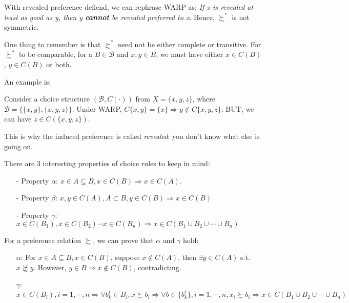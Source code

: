 With revealed preference defiend, we can rephrase WARP as: \textit{If x is revealed at least as good as y, then y \textbf{cannot} be revealed preferred to x}. Hence, $\succsim^*$ is not symmetric.

One thing to remember is that $\succsim^*$ need not be either complete or transitive. For $\succsim^*$ to be comparable, for a $B\in\mathcal{B}$ and $x,y\in B$, we must have either $x\in C(B)$, $y\in C(B)$ or both.

An example is:
\begin{example}
    Consider a choice structure $(\mathcal{B},C(\cdot))$ from $X=\{x,y,z\}$, where $\mathcal{B}=\{\{x,y\},\{x,y,z\}\}$. Under WARP, $C\{x,y\}=\{x\}\Rightarrow y\notin C\{x,y,z\}$.
    BUT, we can have $z\in C(\{x,y,z\})$.
\end{example}

This is why the induced preference is called \textit{revealed}: you don't know what else is going on.

There are 3 interesting properties of choice rules to keep in mind:
\begin{enumerate}
    \item[-] Property $\alpha$: $x\in A \subseteq B,x\in C(B)\Rightarrow x\in C(A)$.
    \item[-] Property $\beta$: $x,y\in C(A), A\subset B, y\in C(B)\Rightarrow x\in C(B)$
    \item[-] Property $\gamma$: $x\in C(B_1),x\in C(B_2) \cdots x\in C(B_n)\Rightarrow x\in C(B_1\cup B_2\cup\cdots\cup B_n)$
\end{enumerate}

For a preference relation $\succsim$, we can prove that $\alpha$ and $\gamma$ hold:
\begin{enumerate}
    \item[$\alpha$:] For $x\in A \subseteq B,x\in C(B)$, suppose $x\notin C(A)$, then $\exists y\in C(A)$ s.t. $x \not\succsim y$. However, $y\in B\Rightarrow x\notin C(B)$, contradicting.
    \item[$\gamma$:] $x\in C(B_i),i=1,\cdots,n\Rightarrow \forall b^i_k \in B_i, x\succsim b_i\Rightarrow \forall b\in \{b^i_k\}, i=1,\cdots,n, x_i\succsim b_i\Rightarrow x\in C(B_1\cup B_2\cup\cdots\cup B_n)$
\end{enumerate}